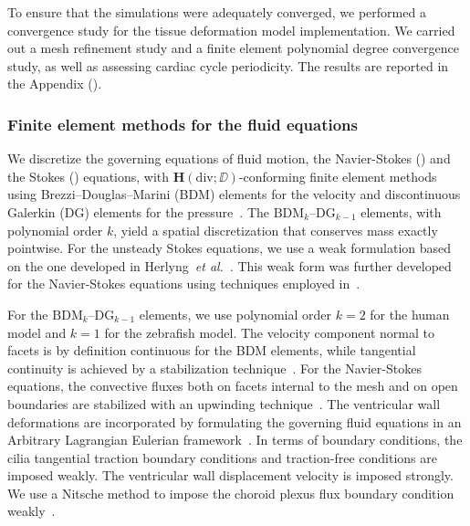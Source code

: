 \documentclass{template}
\begin{document}
To ensure that the simulations were adequately converged, we performed
a convergence study for the tissue deformation model implementation. We 
carried out a mesh refinement study and a finite element polynomial degree 
convergence study, as well as assessing cardiac cycle periodicity. The results
are reported in the Appendix ().

\subsubsection{Finite element methods for the fluid equations}
We discretize the governing equations of fluid motion,
the Navier-Stokes ()
and the Stokes ()
equations, with $\bm{H}(\mathrm{div}; \DD)$-conforming finite element methods
using Brezzi--Douglas--Marini (BDM) elements for the velocity
and discontinuous Galerkin (DG)
elements for the pressure~\citep{Brezzi1985TwoProblems,Nedelec1986AIR3}.
The $\mathrm{BDM}_k$--$\mathrm{DG}_{k-1}$ elements, with polynomial order $k$,
yield a spatial discretization that conserves mass exactly pointwise.
For the unsteady Stokes equations, we use a weak formulation
based on the one developed in
Herlyng~\emph{et al.}~\citep{Herlyng2025AdvectionDiffusion}.
This weak form was further developed for the Navier-Stokes equations
using techniques employed in~\citep{Schroeder2018Towards,di2011mathematical}.

For the $\mathrm{BDM}_k$--$\mathrm{DG}_{k-1}$ elements, we use
polynomial order $k=2$ for the human model and $k=1$ for the 
zebrafish model. The velocity component normal to facets is by definition 
continuous for the BDM elements, while tangential continuity is achieved
by a stabilization technique~\citep{Hong2016AEquations}. 
For the Navier-Stokes equations, the convective fluxes both on facets
internal to the mesh and on open boundaries are stabilized with
an upwinding technique~\citep{Schroeder2018Towards,
di2011mathematical}. The ventricular wall deformations
are incorporated by formulating the governing fluid equations
in an Arbitrary Lagrangian Eulerian framework~\citep{Scovazzi2007LectureNotes,Duarte2004ALE}.
In terms of boundary conditions, the cilia tangential traction
boundary conditions and traction-free conditions are imposed weakly.
The ventricular wall displacement velocity is imposed strongly.
We use a Nitsche method to impose the choroid plexus flux boundary
condition weakly~\citep{Nitsche1971UberSind, benzaken2024constructing}.
\end{document}
